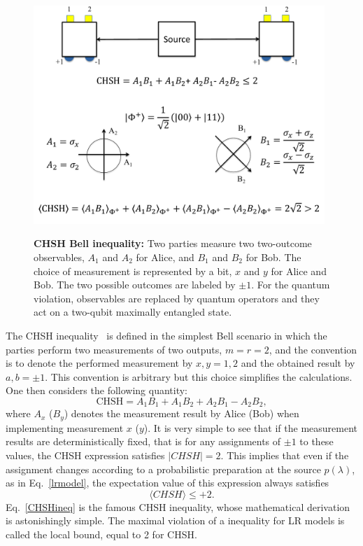 \documentclass[a4paper]{article}
\begin{document}
\begin{figure}
\begin{center}
  \includegraphics[width=11cm]{CHSH_Fig}\\
  \caption{\textbf{CHSH Bell inequality:} Two
  parties measure two two-outcome observables, $A_1$
  and $A_2$ for Alice, and $B_1$ and $B_2$ for Bob. The choice of
  measurement is represented by a bit, $x$ and $y$
  for Alice and Bob. The two possible
  outcomes are labeled by $\pm 1$. For the quantum violation, observables are replaced by quantum operators and they act on a two-qubit maximally entangled state.}\label{CHSHfig}
\end{center}
\end{figure}


The CHSH inequality~\cite{CHSH} is defined in the simplest Bell scenario in which the parties perform two measurements of two outputs, $m=r=2$, and the convention is to denote the performed measurement by $x,y=1,2$ and the obtained result by $a,b=\pm 1$. This convention is arbitrary but this choice simplifies the calculations. One then considers the following quantity:
\begin{equation}\label{CHSHdef}
    \text{CHSH}=A_1B_1+A_1B_2+A_2B_1-A_2B_2 ,
\end{equation}
where $A_x$ ($B_y$) denotes the measurement result by Alice (Bob) when implementing measurement $x$ ($y$). It is very simple to see that if the measurement results are deterministically fixed, that is for any assignments of $\pm 1$ to these values, the CHSH expression satisfies $|CHSH|=2$. This implies that even if the assignment changes according to a probabilistic preparation at the source $p(\lambda)$,  as in Eq.~\eqref{lrmodel}, the expectation value of this expression always satisfies
\begin{equation}\label{CHSHineq}
    \langle CHSH\rangle \leq +2.
\end{equation}
Eq.~\eqref{CHSHineq} is the famous CHSH inequality, whose mathematical derivation is astonishingly simple. The maximal violation of a inequality for LR models is called the local bound, equal to 2 for CHSH.
\end{document}
